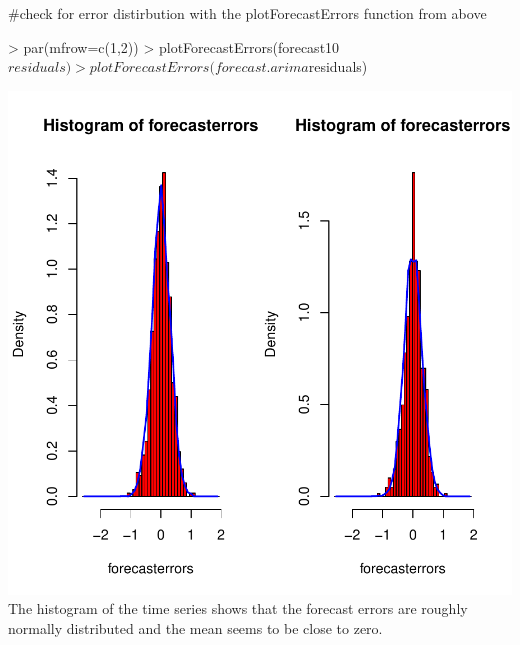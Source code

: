 \documentclass[11pt, a4paper]{article} %
\begin{document}
#check for error distirbution with the plotForecastErrors function from above 
\begin{Schunk}
\begin{Sinput}
> par(mfrow=c(1,2))
> plotForecastErrors(forecast10$residuals)
> plotForecastErrors(forecast.arima$residuals)
\end{Sinput}
\end{Schunk}
\includegraphics{alleselena-062}
\noindent The histogram of the time series shows that the forecast errors are roughly normally distributed and the mean seems to be close to zero.\\
\end{document}
